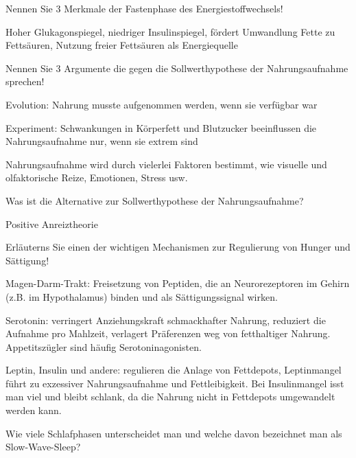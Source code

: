 \documentclass[10pt, a4paper]{exam}
\begin{document}
\begin{questions}
  \question Nennen Sie 3 Merkmale der Fastenphase des Energiestoffwechsels!
  \begin{solution}
    Hoher Glukagonspiegel, niedriger Insulinspiegel, fördert Umwandlung Fette zu Fettsäuren, Nutzung freier Fettsäuren als Energiequelle
  \end{solution}

  \question Nennen Sie 3 Argumente die gegen die Sollwerthypothese der Nahrungsaufnahme sprechen!
  \begin{solution}
    \begin{itemize*}
      \item Evolution: Nahrung musste aufgenommen werden, wenn sie verfügbar war
      \item Experiment: Schwankungen in Körperfett und Blutzucker beeinflussen die Nahrungsaufnahme nur, wenn sie extrem sind
      \item Nahrungsaufnahme wird durch vielerlei Faktoren bestimmt, wie visuelle und olfaktorische
      Reize, Emotionen, Stress usw.
    \end{itemize*}
  \end{solution}

  \question Was ist die Alternative zur Sollwerthypothese der Nahrungsaufnahme?
  \begin{solution}
    Positive Anreiztheorie
  \end{solution}

  \question Erläuterns Sie einen der wichtigen Mechanismen zur Regulierung von Hunger und Sättigung!
  \begin{solution}
\begin{itemize*}
  \item Magen-Darm-Trakt: Freisetzung von Peptiden, die an Neurorezeptoren im Gehirn (z.B. im Hypothalamus) binden und als Sättigungssignal wirken.
  \item Serotonin: verringert Anziehungskraft schmackhafter Nahrung, reduziert die Aufnahme pro Mahlzeit, verlagert Präferenzen weg von fetthaltiger Nahrung. Appetitszügler sind häufig Serotoninagonisten.
  \item Leptin, Insulin und andere: regulieren die Anlage von Fettdepots, Leptinmangel führt zu exzessiver Nahrungsaufnahme und Fettleibigkeit. Bei Insulinmangel isst man viel und bleibt schlank, da die Nahrung nicht in Fettdepots umgewandelt werden kann.
\end{itemize*}
  \end{solution}

  \question Wie viele Schlafphasen unterscheidet man und welche davon bezeichnet man als Slow-Wave-Sleep?
  \begin{solution}


\end{solution}
\end{questions}
\end{document}
